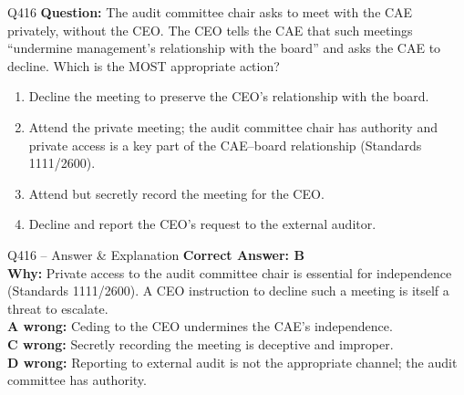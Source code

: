 \documentclass[aspectratio=169,10pt]{beamer}
\begin{document}
	\begin{frame}[t]{Q416}
		\small
		\textbf{Question:} The audit committee chair asks to meet with the CAE privately, without the CEO. The CEO tells the CAE that such meetings ``undermine management's relationship with the board'' and asks the CAE to decline. Which is the MOST appropriate action?
		\begin{enumerate}[label=\Alph*.,itemsep=1pt,topsep=2pt]
			\item Decline the meeting to preserve the CEO's relationship with the board.
			\item Attend the private meeting; the audit committee chair has authority and private access is a key part of the CAE--board relationship (Standards 1111/2600).
			\item Attend but secretly record the meeting for the CEO.
			\item Decline and report the CEO's request to the external auditor.
		\end{enumerate}
	\end{frame}
	
	\begin{frame}[t]{Q416 -- Answer \& Explanation}
		\small
		\textbf{Correct Answer: B} \\[4pt]
		\textbf{Why:} Private access to the audit committee chair is essential for independence (Standards 1111/2600). A CEO instruction to decline such a meeting is itself a threat to escalate. \\[4pt]
		\textbf{A wrong:} Ceding to the CEO undermines the CAE's independence. \\[2pt]
		\textbf{C wrong:} Secretly recording the meeting is deceptive and improper. \\[2pt]
		\textbf{D wrong:} Reporting to external audit is not the appropriate channel; the audit committee has authority.
	\end{frame}
	
\end{document}
